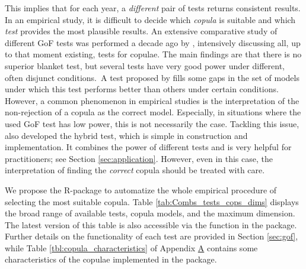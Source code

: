 This implies that for each year, a \emph{different} pair of tests returns consistent results. In an empirical study, it is difficult to decide which \emph{copula} is suitable and which \emph{test} provides the most plausible results. An extensive comparative study of different GoF tests was performed a decade ago by \citet{genest_remillard_beaudoin_2009}, intensively discussing all, up to that moment existing, tests for copulae. The main findings are that there is no superior blanket test, but several tests have very good power under different, often disjunct conditions.~A test proposed by \citet{zhang_okhrin_song_zhou_2016} fills some gaps in the set of models under which this test performs better than others under certain conditions. However, a common phenomenon in empirical studies is the interpretation of the non-rejection of a copula as the correct model. Especially, in situations where the used GoF test has low power, this is not necessarily the case. Tackling this issue, \citet{zhang_okhrin_song_zhou_2016} also developed the hybrid test, which is simple in construction and implementation. It combines the power of different tests and is very helpful for practitioners; see Section \ref{sec:application}. However, even in this case, the interpretation of finding the \emph{correct} copula should be treated with care.

\mycolor
We propose the R-package  to automatize the whole empirical procedure of selecting the most suitable copula. Table \ref{tab:Combs_tests_cops_dims} displays the broad range of available tests, copula models, and the maximum dimension. The latest version of this table is also accessible via the function  in the package. Further details on the functionality of each test are provided in Section \ref{sec:gof}, while Table \ref{tbl:copula_characteristics} of Appendix \hyperref[sec:Appendix:cop]{A} contains some characteristics of the copulae implemented in the package.

